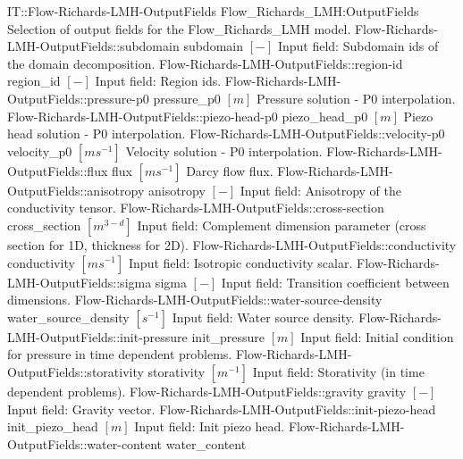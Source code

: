 \begin{SelectionType}
	{IT::Flow-Richards-LMH-OutputFields}
	{Flow{\_}Richards{\_}LMH:OutputFields}
	{{{Selection of output fields for the Flow{\_}Richards{\_}LMH model.}%
}}
		\SelectionItem
			{Flow-Richards-LMH-OutputFields::subdomain}
			{subdomain}
			{{{}{$[-]$}{ Input field: Subdomain ids of the domain decomposition.}%
}}
		\SelectionItem
			{Flow-Richards-LMH-OutputFields::region-id}
			{region{\_}id}
			{{{}{$[-]$}{ Input field: Region ids.}%
}}
		\SelectionItem
			{Flow-Richards-LMH-OutputFields::pressure-p0}
			{pressure{\_}p0}
			{{{}{$[m]$}{ Pressure solution - P0 interpolation.}%
}}
		\SelectionItem
			{Flow-Richards-LMH-OutputFields::piezo-head-p0}
			{piezo{\_}head{\_}p0}
			{{{}{$[m]$}{ Piezo head solution - P0 interpolation.}%
}}
		\SelectionItem
			{Flow-Richards-LMH-OutputFields::velocity-p0}
			{velocity{\_}p0}
			{{{}{$[ms^{-1}]$}{ Velocity solution - P0 interpolation.}%
}}
		\SelectionItem
			{Flow-Richards-LMH-OutputFields::flux}
			{flux}
			{{{}{$[ms^{-1}]$}{ Darcy flow flux.}%
}}
		\SelectionItem
			{Flow-Richards-LMH-OutputFields::anisotropy}
			{anisotropy}
			{{{}{$[-]$}{ Input field: Anisotropy of the conductivity tensor.}%
}}
		\SelectionItem
			{Flow-Richards-LMH-OutputFields::cross-section}
			{cross{\_}section}
			{{{}{$[m^{3-d}]$}{ Input field: Complement dimension parameter (cross section for 1D, thickness for 2D).}%
}}
		\SelectionItem
			{Flow-Richards-LMH-OutputFields::conductivity}
			{conductivity}
			{{{}{$[ms^{-1}]$}{ Input field: Isotropic conductivity scalar.}%
}}
		\SelectionItem
			{Flow-Richards-LMH-OutputFields::sigma}
			{sigma}
			{{{}{$[-]$}{ Input field: Transition coefficient between dimensions.}%
}}
		\SelectionItem
			{Flow-Richards-LMH-OutputFields::water-source-density}
			{water{\_}source{\_}density}
			{{{}{$[s^{-1}]$}{ Input field: Water source density.}%
}}
		\SelectionItem
			{Flow-Richards-LMH-OutputFields::init-pressure}
			{init{\_}pressure}
			{{{}{$[m]$}{ Input field: Initial condition for pressure in time dependent problems.}%
}}
		\SelectionItem
			{Flow-Richards-LMH-OutputFields::storativity}
			{storativity}
			{{{}{$[m^{-1}]$}{ Input field: Storativity (in time dependent problems).}%
}}
		\SelectionItem
			{Flow-Richards-LMH-OutputFields::gravity}
			{gravity}
			{{{}{$[-]$}{ Input field: Gravity vector.}%
}}
		\SelectionItem
			{Flow-Richards-LMH-OutputFields::init-piezo-head}
			{init{\_}piezo{\_}head}
			{{{}{$[m]$}{ Input field: Init piezo head.}%
}}
		\SelectionItem
			{Flow-Richards-LMH-OutputFields::water-content}
			{water{\_}content}

\end{SelectionType}
